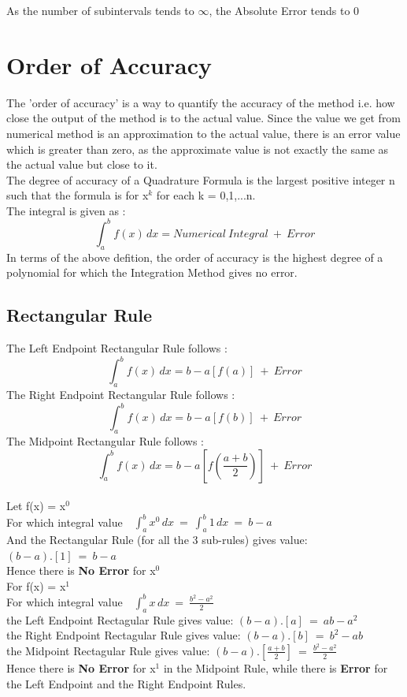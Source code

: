 \documentclass[11pt]{article}
\begin{document}
As the number of subintervals tends to $\infty$, the Absolute Error tends to 0
\pagebreak

\section{Order of Accuracy}
The 'order of accuracy' is a way to quantify the accuracy of the method i.e. how close the output of the method is to the actual value. Since the value we get from numerical method is an approximation to the actual value, there is an error value which is greater than zero, as the approximate value is not exactly the same as the actual value but close to it.\\

The degree of accuracy of a Quadrature Formula is the largest positive integer n such that the formula is for x$^k$ for each k = 0,1,...n.\\

The integral is given as : 
\[ \int_{a}^{b}f(x) \,dx = Numerical~Integral~+~Error\]
In terms of the above defition, the order of accuracy is the highest degree of a polynomial for which the Integration Method gives no error.
\subsection{Rectangular Rule}
The Left Endpoint Rectangular Rule follows : 
\[\int_{a}^{b}f(x) \,dx = {b-a}[f(a)]~+~Error\]
The Right Endpoint Rectangular Rule follows : 
\[\int_{a}^{b}f(x) \,dx = {b-a}[f(b)]~+~Error\]
The Midpoint Rectangular Rule follows : 
\[\int_{a}^{b}f(x) \,dx = {b-a}[f(\frac{a+b}{2})]~+~Error\] \\

Let f(x) = x$^0$\\
For which integral value~~$\int_{a}^{b} x^0 \,dx~=~\int_{a}^{b} 1 \,dx~=~ b-a$\\
And the Rectangular Rule (for all the 3 sub-rules) gives value: $(b-a).[1]~=~b-a$ \\
Hence there is \textbf{No Error} for x$^0$ \\

For f(x) = x$^1$\\
For which integral value~~$\int_{a}^{b} x \,dx~=~\frac{b^2-a^2}{2}$\\
the Left Endpoint Rectagular Rule gives value: $(b-a).[a]~=~ab-a^2$\\
the Right Endpoint Rectagular Rule gives value: $(b-a).[b]~=~b^2-ab$\\
the Midpoint Rectagular Rule gives value: $(b-a).[\frac{a+b}{2}]~=~\frac{b^2-a^2}{2}$\\
Hence there is \textbf{No Error} for x$^1$ in the Midpoint Rule, while there is \textbf{Error} for the Left Endpoint and the Right Endpoint Rules.\\
\end{document}
